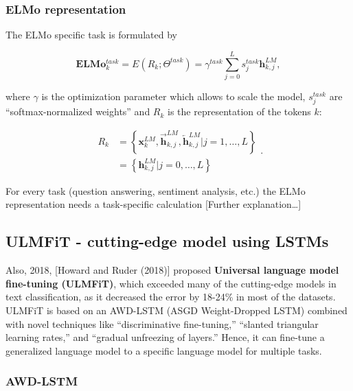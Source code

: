 \documentclass[]{krantz}
\begin{document}
\hypertarget{elmo-representation}{%
\subsubsection{ELMo representation}\label{elmo-representation}}

The ELMo specific task is formulated by

\[\mathbf{E} \mathbf{L} \mathbf{M} \mathbf{o}_{k}^{t a s k}=E\left(R_{k} ; \Theta^{t a s k}\right)=\gamma^{t a s k} \sum_{j=0}^{L} s_{j}^{t a s k} \mathbf{h}_{k, j}^{L M},\]

where \(\gamma\) is the optimization parameter which allows to scale the model, \(s_{j}^{t a s k}\) are ``softmax-normalized weights'' and \(R_{k}\) is the representation of the tokens \(k\):

\[\begin{aligned}
R_{k} &=\left\{\mathbf{x}_{k}^{L M}, \overrightarrow{\mathbf{h}}_{k, j}^{L M}, \overleftarrow{\mathbf{h}}_{k, j}^{L M} | j=1, \ldots, L\right\} \\
&=\left\{\mathbf{h}_{k, j}^{L M} | j=0, \ldots, L\right\}
\end{aligned}.\]

For every task (question answering, sentiment analysis, etc.) the ELMo representation needs a task-specific calculation {[}Further explanation\ldots{}{]}

\hypertarget{ulmfit---cutting-edge-model-using-lstms}{%
\subsection{ULMFiT - cutting-edge model using LSTMs}\label{ulmfit---cutting-edge-model-using-lstms}}

Also, 2018, {[}Howard and Ruder (2018){]} proposed \textbf{Universal language model fine-tuning (ULMFiT)}, which exceeded many of the cutting-edge models in text classification, as it decreased the error by 18-24\% in most of the datasets.
ULMFiT is based on an AWD-LSTM (ASGD Weight-Dropped LSTM) combined with novel techniques like ``discriminative fine-tuning,'' ``slanted triangular learning rates,'' and ``gradual unfreezing of layers.'' Hence, it can fine-tune a generalized language model to a specific language model for multiple tasks.

\hypertarget{awd-lstm}{%
\subsubsection{AWD-LSTM}\label{awd-lstm}}
\end{document}
